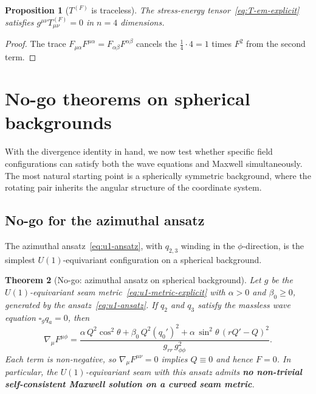 \documentclass[pdflatex,sn-mathphys-num]{sn-jnl}
\theoremstyle{thmstyleone}%
\newtheorem{theorem}{Theorem}[section]
\newtheorem{proposition}[theorem]{Proposition}
\theoremstyle{thmstyletwo}%
\theoremstyle{thmstylethree}%
\newcommand{\nn}{\nabla}
\numberwithin{equation}{section}
\begin{document}
\begin{proposition}[$T^{(F)}$ is traceless]
\label{prop:T-traceless}
The stress-energy tensor~\eqref{eq:T-em-explicit} satisfies
$g^{\mu\nu}T^{(F)}_{\mu\nu} = 0$ in $n=4$ dimensions.
\end{proposition}

\begin{proof}
The trace $F_{\mu\alpha}F^{\mu\alpha}
= F_{\alpha\beta}F^{\alpha\beta}$ cancels the
$\frac{1}{4}\cdot 4 = 1$ times $F^2$ from the second term.
\end{proof}

\section{No-go theorems on spherical backgrounds}
\label{sec:nogo}

With the divergence identity in hand, we now test whether
specific field configurations can satisfy both the wave equations
and Maxwell simultaneously.  The most natural starting point is
a spherically symmetric background, where the rotating pair
inherits the angular structure of the coordinate system.

\subsection{No-go for the azimuthal ansatz}

The azimuthal ansatz~\eqref{eq:u1-ansatz}, with $q_{2,3}$
winding in the $\phi$-direction, is the simplest
$U(1)$-equivariant configuration on a spherical background.

\begin{theorem}[No-go: azimuthal ansatz on spherical background]
\label{thm:no-go-maxwell}
Let $g$ be the $U(1)$-equivariant seam
metric~\eqref{eq:u1-metric-explicit} with $\alpha > 0$ and
$\beta_0 \ge 0$, generated by the
ansatz~\eqref{eq:u1-ansatz}.  If $q_2$ and $q_3$ satisfy the
massless wave equation $\square_g q_a = 0$, then
\begin{equation}
\label{eq:no-go-residue}
\nn_\mu F^{\mu\phi}
= \frac{
    \alpha\,Q^2\cos^2\!\theta
  + \beta_0\,Q^2(q_0')^2
  + \alpha\,\sin^2\!\theta\,(rQ'-Q)^2
  }{g_{rr}\,g_{\phi\phi}^2}.
\end{equation}
Each term is non-negative, so $\nn_\mu F^{\mu\nu} = 0$ implies
$Q \equiv 0$ and hence $F = 0$.  In particular, the
$U(1)$-equivariant seam with this ansatz admits \textbf{no
non-trivial self-consistent Maxwell solution on a curved seam metric}.
\end{theorem}
\end{document}
